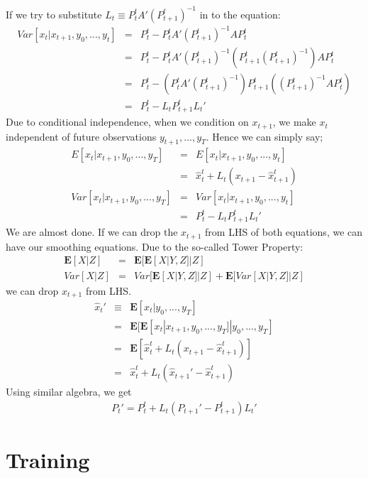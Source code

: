 If we try to substitute $L_t \equiv P_{t}^tA'(P_{t+1}^t)^{-1}$ in to the
equation:
\begin{eqnarray*}
Var[x_t|x_{t+1},y_0,...,y_t] &=& P_{t}^t - P_{t}^t A'(P_{t+1}^t)^{-1}AP_{t}^t \\
&=& P_{t}^t - P_{t}^tA'(P_{t+1}^t)^{-1} (P_{t+1}^t(P_{t+1}^t)^{-1}) AP_{t}^t\\
&=& P_{t}^t - (P_{t}^tA'(P_{t+1}^t)^{-1}) P_{t+1}^t ((P_{t+1}^t)^{-1} AP_{t}^t)\\
&=& P_{t}^t - L_t  P_{t+1}^t L_t'
\end{eqnarray*}
Due to conditional independence, when we condition on $x_{t+1}$, we make $x_t$
independent of future observations $y_{t+1},...,y_T$. Hence we can simply say;
\begin{eqnarray*}
E[x_t|x_{t+1},y_0,...,y_T]  &=& E[x_t|x_{t+1},y_0,...,y_t]\\
&=& \hat{x}_{t}^t +L_t(x_{t+1}-\hat{x}_{t+1}^t) \\
Var[x_t|x_{t+1},y_0,...,y_T]  &=& Var[x_t|x_{t+1},y_0,...,y_t] \\
&=& P_{t}^t - L_t  P_{t+1}^t L_t'
\end{eqnarray*}
We are almost done. If we can drop the $x_{t+1}$ from LHS of both equations, we
can have our smoothing equations. Due to the so-called Tower Property:
\begin{eqnarray*}
\mathbf{E}[X|Z] &=& \mathbf{E}[\mathbf{E}[X|Y,Z]|Z]\\
Var[X|Z] &=& Var[\mathbf{E}[X|Y,Z]|Z] + \mathbf{E}[Var[X|Y,Z]|Z]
\end{eqnarray*}
we can drop $x_{t+1}$ from LHS.
\begin{eqnarray*}
\hat{x}_{t}' & \equiv & \mathbf{E}[x_t|y_0,...,y_T] \nonumber\\
& = & \mathbf{E}[\mathbf{E}[x_t|x_{t+1},y_0,...,y_T]|y_0,...,y_T] \nonumber\\
& = & \mathbf{E}[\hat{x}_{t}^t +L_t(x_{t+1}-\hat{x}_{t+1}^t)] \nonumber\\
& = & \hat{x}_{t}^t +L_t(\hat{x}_{t+1}' -\hat{x}_{t+1}^t) \label{xsmooth}
\end{eqnarray*}
Using similar algebra, we get
\begin{eqnarray*}
P_{t}'  = P_{t}^t + L_t(P_{t+1}'-P_{t+1}^t)L_t'
\end{eqnarray*}


\section{Training}

